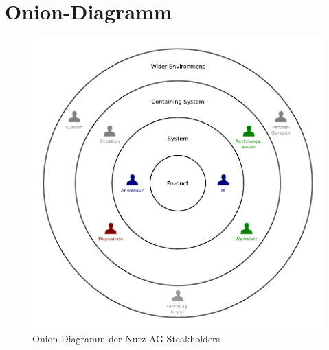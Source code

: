 \documentclass[12pt,a4paper,german]{article}
\author{Denis Augsburger, Pierro Steinger, Thomas Wilde, Nicolas Mauchle, }
\begin{document}

\newpage
\tableofcontents

\newpage
\section{Onion-Diagramm}
\begin{center}
  \begin{figure}[h]
    \centering
    \includegraphics{graphics/onion.pdf}
    \caption{Onion-Diagramm der Nutz AG Steakholders}
    \label{fig:awesome_image}
  \end{figure}
\end{center}


\end{document}
